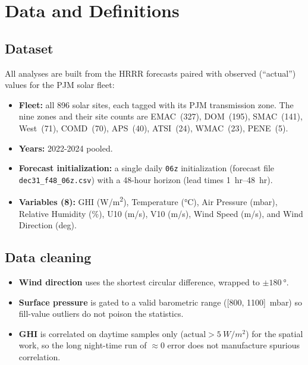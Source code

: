 \section{Data and Definitions}
\label{sec:data}

\subsection{Dataset}

All analyses are built from the HRRR forecasts paired with observed
(``actual'') values for the PJM solar fleet:

\begin{itemize}
  \item \textbf{Fleet:} all \num{896} solar sites, each tagged with its PJM transmission zone. The nine zones and their site counts are EMAC~(327), DOM~(195),
        SMAC~(141), West~(71), COMD~(70), APS~(40), ATSI~(24), WMAC~(23), PENE~(5).
  \item \textbf{Years:} 2022-2024 pooled.
  \item \textbf{Forecast initialization:} a single daily \texttt{06z} initialization
        (forecast file \texttt{dec31\_f48\_06z.csv}) with a 48-hour horizon
        (lead times \SI{1}{hr}--\SI{48}{hr}).
  \item \textbf{Variables (8):} GHI (\si{W/m^2}), Temperature (\si{\degreeCelsius}),
        Air Pressure (mbar), Relative Humidity (\si{\percent}), U10 (\si{m/s}), V10 (\si{m/s}),
        Wind Speed (\si{m/s}), and Wind Direction (deg).
\end{itemize}

\subsection{Data cleaning}

\begin{itemize}
  \item \textbf{Wind direction} uses the shortest circular difference, wrapped to
        $\pm\SI{180}{\degree}$.
  \item \textbf{Surface pressure} is gated to a valid barometric range ([800, 1100]~mbar) so
        fill-value outliers do not poison the statistics.
  \item \textbf{GHI} is correlated on daytime samples only ($\text{actual} > \SI{5}{W/m^2}$) for
        the spatial work, so the long night-time run of $\approx 0$ error does not manufacture
        spurious correlation.
\end{itemize}

